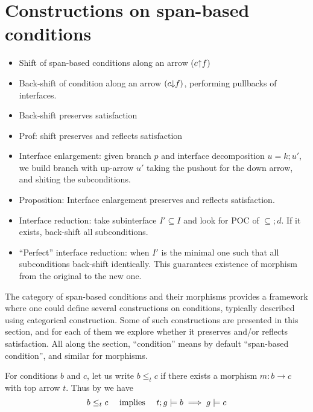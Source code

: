 \section{Constructions on span-based conditions}



\begin{itemize}
  \item Shift of span-based conditions along an arrow $(c{\uparrow} f)$
  \item Back-shift of condition along an arrow $(c{\downarrow} f)$, performing pullbacks of interfaces. 
  \item Back-shift preserves satisfaction 
  \item Prof: shift preserves and reflects satisfaction
  \item Interface enlargement: given  branch $p$ and interface decomposition $u = k;u'$, we build branch with up-arrow $u'$ taking the pushout for the down arrow, and shiting the subconditions.
  \item Proposition: Interface enlargement preserves and reflects satisfaction.
  \item Interface reduction: take subinterface $I' \subseteq I$ and look for POC of $\subseteq ; d$. If it exists, back-shift all subconditions. 
  \item ``Perfect'' interface reduction: when $I'$ is the minimal one such that all subconditions back-shift identically. This guarantees existence of morphism from the original to the new one. 
\end{itemize}  

The category of span-based conditions and their morphisms provides a framework 
where one could define several constructions on conditions, typically described using categorical construction. Some of such constructions are presented in this section, and for each of them we explore whether it preserves and/or reflects satisfaction. All along the section, ``condition'' means by default ``span-based condition'', and similar for morphisms. 

For conditions $b$ and $c$, let us write $b \leq_t c$ if there exists a morphism $m: b \to c$ with top arrow $t$. Thus by  we have
\begin{equation}
    \label{eq:morphPresSat}
    b \leq_t c \quad \mbox{  implies  }\quad  t;g \models b \implies g \models c
\end{equation}


